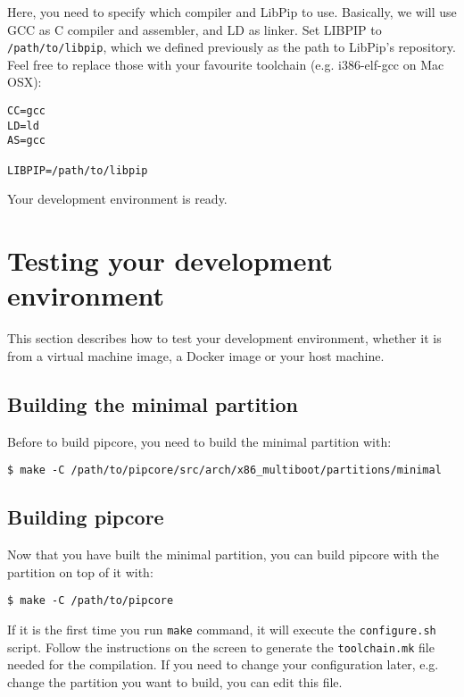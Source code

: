 \documentclass[10pt,a4paper,titlepage]{refart}
\begin{document}
Here, you need to specify which compiler and LibPip to use. Basically, we will
use GCC as C compiler and assembler, and LD as linker. Set LIBPIP to
\texttt{/path/to/libpip}, which we defined previously as the path to LibPip's
repository. Feel free to replace those with your favourite toolchain (e.g.
i386-elf-gcc on Mac OSX):

\begin{lstlisting}
CC=gcc
LD=ld
AS=gcc

LIBPIP=/path/to/libpip
\end{lstlisting}

Your development environment is ready.

\section{Testing your development environment}

This section describes how to test your development environment, whether it is
from a virtual machine image, a Docker image or your host machine.

\subsection{Building the minimal partition}

Before to build pipcore, you need to build the minimal partition with:

\begin{lstlisting}[style=BashStyle]
    $ make -C /path/to/pipcore/src/arch/x86_multiboot/partitions/minimal
\end{lstlisting}

\subsection{Building pipcore}

Now that you have built the minimal partition, you can build pipcore with the
partition on top of it with:

\begin{lstlisting}[style=BashStyle]
    $ make -C /path/to/pipcore
\end{lstlisting}

If it is the first time you run \texttt{make} command, it will execute the
\texttt{configure.sh} script. Follow the instructions on the screen to generate
the \texttt{toolchain.mk} file needed for the compilation. If you need to change
your configuration later, e.g. change the partition you want to build, you can
edit this file.
\end{document}
